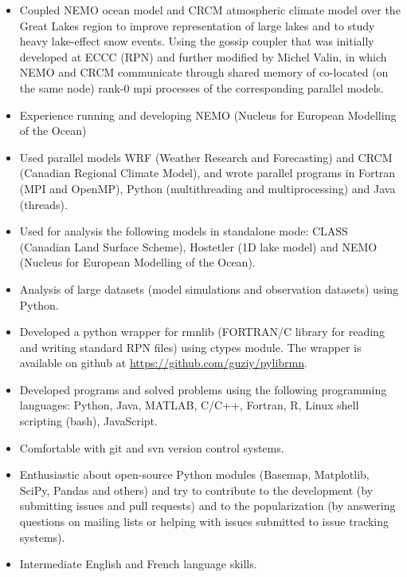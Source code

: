 \documentclass[12pt,a4paper,sans]{moderncv}
\begin{document}
\begin{itemize}
  \item Coupled NEMO ocean model and CRCM atmospheric climate model over the Great Lakes region to improve representation of large lakes and 
  to study heavy lake-effect snow events. 
  Using the gossip coupler that was initially developed at ECCC (RPN) and further modified by Michel Valin, in which NEMO and CRCM communicate through shared 
  memory of co-located (on the same node) rank-0 mpi processes of the corresponding parallel models.
  \item Experience running and developing NEMO (Nucleus for European Modelling of the Ocean)
  \item Used parallel models WRF (Weather Research and Forecasting) and CRCM
  (Canadian Regional Climate Model), and wrote parallel programs in Fortran
  (MPI and OpenMP), Python (multithreading and multiprocessing) and Java (threads).

  \item Used for analysis the following models in standalone mode: CLASS (Canadian Land Surface Scheme), Hostetler (1D lake model) and NEMO (Nucleus for European Modelling of the Ocean).

  \item Analysis of large datasets (model simulations and observation datasets) using Python.

  \item Developed a python wrapper for rmnlib (FORTRAN/C library for reading and writing standard RPN files) using ctypes module. 
   The wrapper is available on github at \href{https://github.com/guziy/pylibrmn}{https://github.com/guziy/pylibrmn}.

  \item Developed programs and solved problems using the following programming languages: 
  Python, Java, MATLAB, C/C++, Fortran, R, Linux shell scripting (bash), JavaScript.

  \item Comfortable with git and svn version control systems.

  \item Enthusiastic about open-source Python modules (Basemap, Matplotlib,
  SciPy, Pandas and others) and try to contribute to the development (by
  submitting issues and pull requests) and to the popularization (by answering
  questions on mailing lists or helping with issues submitted to
  issue tracking systems).

  \item Intermediate English and French language skills. 

\end{itemize}
\end{document}
